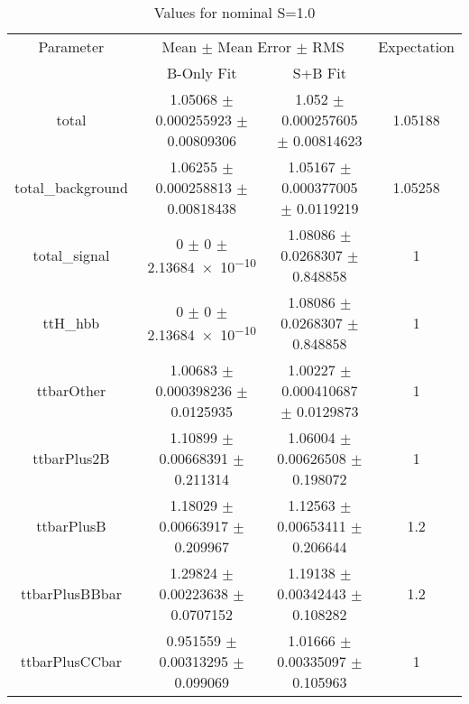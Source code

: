 \begin{table}
\centering
\caption{Values for nominal S=1.0}
\begin{tabular}{cccc}
\toprule
Parameter & \multicolumn{2}{c}{Mean $\pm$ Mean Error $\pm$ RMS} & Expectation\\
 & B-Only Fit & S+B Fit & \\
\midrule
total & \num{1.05068} $\pm$ \num{0.000255923} $\pm$ \num{0.00809306} & \num{1.052} $\pm$ \num{0.000257605} $\pm$ \num{0.00814623} & \num{1.05188}\\
total\_background & \num{1.06255} $\pm$ \num{0.000258813} $\pm$ \num{0.00818438} & \num{1.05167} $\pm$ \num{0.000377005} $\pm$ \num{0.0119219} & \num{1.05258}\\
total\_signal & \num{0} $\pm$ \num{0} $\pm$ \num{2.13684e-10} & \num{1.08086} $\pm$ \num{0.0268307} $\pm$ \num{0.848858} & \num{1}\\
ttH\_hbb & \num{0} $\pm$ \num{0} $\pm$ \num{2.13684e-10} & \num{1.08086} $\pm$ \num{0.0268307} $\pm$ \num{0.848858} & \num{1}\\
ttbarOther & \num{1.00683} $\pm$ \num{0.000398236} $\pm$ \num{0.0125935} & \num{1.00227} $\pm$ \num{0.000410687} $\pm$ \num{0.0129873} & \num{1}\\
ttbarPlus2B & \num{1.10899} $\pm$ \num{0.00668391} $\pm$ \num{0.211314} & \num{1.06004} $\pm$ \num{0.00626508} $\pm$ \num{0.198072} & \num{1}\\
ttbarPlusB & \num{1.18029} $\pm$ \num{0.00663917} $\pm$ \num{0.209967} & \num{1.12563} $\pm$ \num{0.00653411} $\pm$ \num{0.206644} & \num{1.2}\\
ttbarPlusBBbar & \num{1.29824} $\pm$ \num{0.00223638} $\pm$ \num{0.0707152} & \num{1.19138} $\pm$ \num{0.00342443} $\pm$ \num{0.108282} & \num{1.2}\\
ttbarPlusCCbar & \num{0.951559} $\pm$ \num{0.00313295} $\pm$ \num{0.099069} & \num{1.01666} $\pm$ \num{0.00335097} $\pm$ \num{0.105963} & \num{1}\\
\bottomrule
\end{tabular}
\end{table}